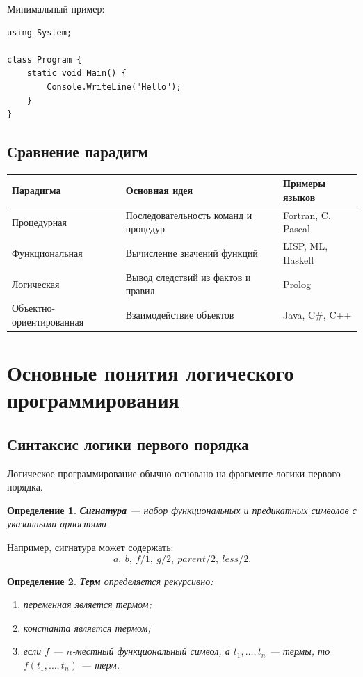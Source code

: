 \documentclass[12pt,a4paper]{article}
\newtheorem{definition}{Определение}
\begin{document}
Минимальный пример:
\begin{lstlisting}[language={[Sharp]C}]
using System;

class Program {
    static void Main() {
        Console.WriteLine("Hello");
    }
}
\end{lstlisting}

\subsection{Сравнение парадигм}

\begin{center}
\begin{tabular}{|m{3cm}|m{4cm}|m{5cm}|}
\hline
\textbf{Парадигма} & \textbf{Основная идея} & \textbf{Примеры языков} \\
\hline
Процедурная & Последовательность команд и процедур & Fortran, C, Pascal \\
\hline
Функциональная & Вычисление значений функций & LISP, ML, Haskell \\
\hline
Логическая & Вывод следствий из фактов и правил & Prolog \\
\hline
Объектно-ориентированная & Взаимодействие объектов & Java, C\#, C++ \\
\hline
\end{tabular}
\end{center}

\section{Основные понятия логического программирования}

\subsection{Синтаксис логики первого порядка}

Логическое программирование обычно основано на фрагменте логики первого порядка.

\begin{definition}
\textbf{Сигнатура} --- набор функциональных и предикатных символов с указанными арностями.
\end{definition}

Например, сигнатура может содержать:
$$
a,\ b,\ f/1,\ g/2,\ parent/2,\ less/2.
$$

\begin{definition}
\textbf{Терм} определяется рекурсивно:
\begin{enumerate}
    \item переменная является термом;
    \item константа является термом;
    \item если $f$ --- $n$-местный функциональный символ, а $t_1,\dots,t_n$ --- термы, то $f(t_1,\dots,t_n)$ --- терм.
\end{enumerate}
\end{definition}
\end{document}
